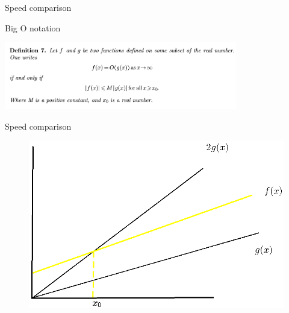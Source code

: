 \begin{frame}{Speed comparison}

\begin{block}{Big O notation}

\centerline{\includegraphics[width=4in]{g.png}}

\end{block}

\end{frame}

\begin{frame}{Speed comparison}

\begin{figure}[h]
  \includegraphics{thesis-8.eps}
\end{figure}

\end{frame}

